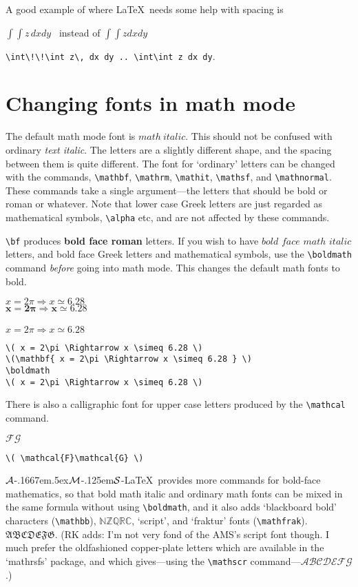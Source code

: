 \documentclass[a4paper]{article}
\newlength{\egwidth}\setlength{\egwidth}{0.45\textwidth}
\newenvironment{eg}%
{\begin{list}{}{\setlength{\leftmargin}{0pt}%
\setlength{\rightmargin}{\leftmargin}}\item[]\footnotesize}%
{\end{list}}
\newcommand{\AmsLaTeX}{{$\cal A$}\kern-.1667em\lower.5ex\hbox
{$\cal M$}\kern-.125em{$\cal S$}-\LaTeX}
\newenvironment{egbox}%
{\begin{minipage}[t]{\egwidth}}%
{\end{minipage}}
\newcommand{\egstart}{\begin{eg}\begin{egbox}}
\newcommand{\egmid}{\end{egbox}\hfill\begin{egbox}}
\newcommand{\egend}{\end{egbox}\end{eg}}
\begin{document}
A good example of where \LaTeX\ needs some help with spacing is
\egstart
$\int\!\!\int z\, dx dy$ \ instead of $\int\int z dx dy$
\egmid
\verb|\int\!\!\int z\, dx dy .. \int\int z dx dy|.
\egend

\section{Changing fonts in math mode}
The default math mode font is $math\ italic$. This should not be
confused with ordinary {\em text italic}.  The letters are
a slightly different shape, and the spacing between them is 
quite different.
The font for `ordinary' letters can be changed with the 
commands, \verb|\mathbf|, \verb|\mathrm|, \verb|\mathit|,
\verb|\mathsf|, and \verb|\mathnormal|.
These commands take a single argument---the letters that
should be bold or roman or whatever.
Note that lower case Greek letters
are just regarded as mathematical symbols, \verb|\alpha| etc, and are
not affected by these commands.

\verb|\bf| produces {\bf bold face roman} letters. If you wish
to have {\boldmath $bold$ $face$ $math$ $italic$} letters, and bold face 
Greek letters and mathematical symbols, use the \verb|\boldmath| command
{\em before\/} going into math mode. 
This changes the default math fonts to bold.

\egstart{\normalsize
\( x = 2\pi \Rightarrow x \simeq 6.28 \)\\
\(\mathbf{ x = 2\pi \Rightarrow x \simeq 6.28 } \)\\\mbox{}\\
\boldmath
\( x = 2\pi \Rightarrow x \simeq 6.28 \)}
\egmid
\begin{verbatim}
\( x = 2\pi \Rightarrow x \simeq 6.28 \)
\(\mathbf{ x = 2\pi \Rightarrow x \simeq 6.28 } \)
\boldmath
\( x = 2\pi \Rightarrow x \simeq 6.28 \)
\end{verbatim}
\egend

There is also a calligraphic font for upper case letters
produced by the \verb|\mathcal| command.

\egstart
\( \mathcal{F}\mathcal{G} \)
\egmid
\verb|\( \mathcal{F}\mathcal{G} \)|
\egend

\AmsLaTeX\ provides more commands for bold-face mathematics, so that
bold math italic and ordinary math fonts can be mixed in the same
formula without using \verb|\boldmath|, and it also adds `blackboard bold'
characters (\verb|\mathbb|), $\mathbb{NZQRC}$, 
`script', and `fraktur' fonts (\verb|\mathfrak|). $\mathfrak{ABCDEFG}$.  
(RK adds: I'm not very fond of the AMS's script
font though.  I much prefer the oldfashioned copper-plate letters
which are available in the `mathrsfs' package, and which gives---using the
\verb|\mathscr| command---$\mathscr{ABCDEFG}$.)
\end{document}
